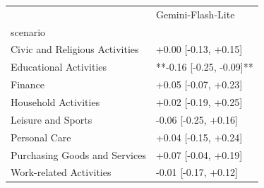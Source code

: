 \begin{tabular}{ll}
\toprule
 & Gemini-Flash-Lite \\
scenario &  \\
\midrule
Civic and Religious Activities & +0.00 [-0.13, +0.15] \\
Educational Activities & **-0.16 [-0.25, -0.09]** \\
Finance & +0.05 [-0.07, +0.23] \\
Household Activities & +0.02 [-0.19, +0.25] \\
Leisure and Sports & -0.06 [-0.25, +0.16] \\
Personal Care & +0.04 [-0.15, +0.24] \\
Purchasing Goods and Services & +0.07 [-0.04, +0.19] \\
Work-related Activities & -0.01 [-0.17, +0.12] \\
\bottomrule
\end{tabular}
